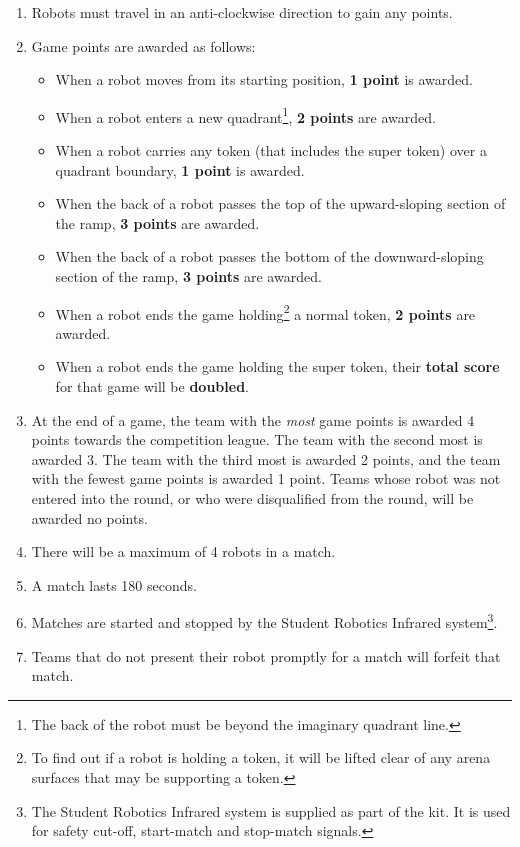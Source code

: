 \begin{enumerate}
\item Robots must travel in an anti-clockwise direction to gain any points.

\item Game points are awarded as follows:

\begin{itemize}
\item When a robot moves from its starting position, \textbf{1 point} is awarded.
\item When a robot enters a new quadrant\footnote{The back of the robot must be beyond the imaginary quadrant line.}, \textbf{2 points} are awarded.
\item When a robot carries any token (that includes the super token) over a quadrant boundary, \textbf{1 point} is awarded.
\item When the back of a robot passes the top of the upward-sloping section of the ramp, \textbf{3 points} are awarded.
\item When the back of a robot passes the bottom of the downward-sloping section of the ramp, \textbf{3 points} are awarded.
\item When a robot ends the game holding\footnote{To find out if a robot is holding a token, it will be lifted clear of any arena surfaces that may be supporting a token.} a normal token, \textbf{2 points} are awarded.
\item When a robot ends the game holding the super token, their \textbf{total score} for that game will be \textbf{doubled}.
\end{itemize}

\item At the end of a game, the team with the \emph{most} game points is awarded 4 points towards the competition league.
 The team with the second most is awarded 3.
 The team with the third most is awarded 2 points, and the team with the fewest game points is awarded 1 point.
 Teams whose robot was not entered into the round, or who were disqualified from the round, will be awarded no points.

\item There will be a maximum of 4 robots in a match.
\item A match lasts 180 seconds.
\item Matches are started and stopped by the Student Robotics Infrared system\footnote{The Student Robotics Infrared system is supplied as part of the kit.
 It is used for safety cut-off, start-match and stop-match signals.}.
\item Teams that do not present their robot promptly for a match will forfeit that match.
\end{enumerate}

